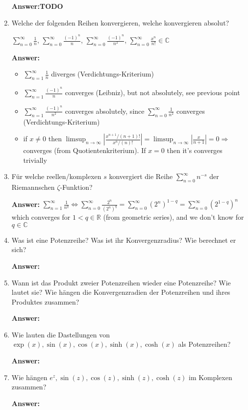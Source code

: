 \documentclass[11pt]{article}
\newcommand{\abs}[1]{\left|#1\right|}
\newcommand{\sumn}[4]{\sum_{#1=#2}^{#3}{#4}}
\begin{document}
\begin{enumerate}
    \textbf{Answer:}\textbf{TODO}

    \item  Welche der folgenden Reihen konvergieren, welche konvergieren absolut?
    \begin{center}
        $\sum_{n=0}^\infty {\frac{1}{n}}$, $\sum_{n=0}^\infty \frac{(-1)^n}{n}$, $\sum_{n=0}^\infty \frac{(-1)^n}{n^2}$, $\sum_{n=0}^\infty \frac{x^n}{n!} \in \mathbb{C}$
    \end{center}

    \textbf{Answer:}
    \begin{itemize}
        \item $\sum_{n=1}^\infty {\frac{1}{n}}$ diverges (Verdichtungs-Kriterium)
        \item $\sum_{n=1}^\infty \frac{(-1)^n}{n}$ converges (Leibniz), but not absolutely, see previous point
        \item $\sum_{n=1}^\infty \frac{(-1)^n}{n^2}$ converges absolutely, since $\sum_{n=0}^\infty \frac{1}{n^2}$ converges (Verdichtungs-Kriterium)
        \item if $x\neq0$ then $\limsup_{n\to\infty}\abs{\frac{x^{n+1}/(n+1)!}{x^{n}/(n)!}} = \limsup_{n\to\infty}\abs{\frac{x}{n+1}} = 0 \Rightarrow$ converges (from Quotientenkriterium). If $x=0$ then it's converges trivially
    \end{itemize}
    \item  Für welche reellen/komplexen $s$ konvergiert die Reihe $\sum_{n=0}^\infty n^{-s}$ der Riemannschen
    $\zeta$-Funktion?

    \textbf{Answer:} $\sumn{n}{1}{\infty}{\frac{1}{n^q}} \Leftrightarrow \sumn{n}{0}{\infty}{\frac{2^n}{(2^n)^q}} = \sumn{n}{0}{\infty}{(2^n)^{1-q}} = \sumn{n}{0}{\infty}{(2^{1-q})^n}$ which converges for $1 < q \in \mathbb{R}$ (from geometric series), and we don't know for $q\in\mathbb{C}$ 

    \item  Was ist eine Potenzreihe? Was ist ihr Konvergenzradius? Wie berechnet er sich?
    
    \textbf{Answer:}

    \item  Wann ist das Produkt zweier Potenzreihen wieder eine Potenzreihe? Wie lautet sie? Wie hängen die Konvergenzradien der Potenzreihen und ihres Produktes zusammen?
    
    \textbf{Answer:}

    \item  Wie lauten die Dastellungen von $\exp(x), \sin(x), \cos(x), \sinh(x), \cosh(x)$ als Potenzreihen?
    
    \textbf{Answer:}

    \item  Wie hängen $e^z, \sin(z), \cos(z), \sinh(z), \cosh(z)$ im Komplexen zusammen?

    \textbf{Answer:}
\end{enumerate}
\end{document}
